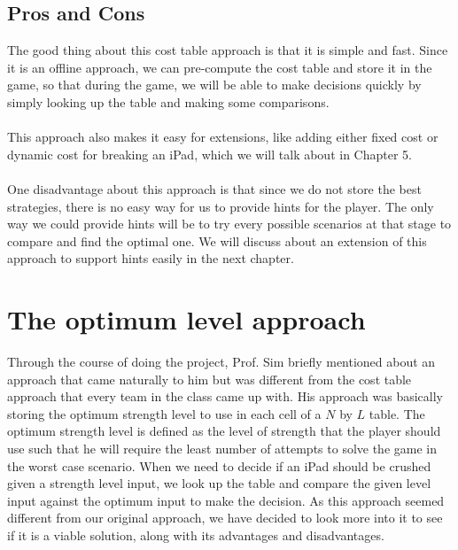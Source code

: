 \documentclass[12pt,a4paper,oneside]{report}
\begin{document}
\section{Pros and Cons}
The good thing about this cost table approach is that it is simple and fast. Since it is an offline approach, we can pre-compute the cost table and store it in the game, so that during the game, we will be able to make decisions quickly by simply looking up the table and making some comparisons. \\\\
This approach also makes it easy for extensions, like adding either fixed cost or dynamic cost for breaking an iPad, which we will talk about in Chapter 5. \\\\
One disadvantage about this approach is that since we do not store the best strategies, there is no easy way for us to provide hints for the player. The only way we could provide hints will be to try every possible scenarios at that stage to compare and find the optimal one. We will discuss about an extension of this approach to support hints easily in the next chapter.


\chapter{The optimum level approach}
Through the course of doing the project, Prof. Sim briefly mentioned about an approach that came naturally to him but was different from the cost table approach that every team in the class came up with. His approach was basically storing the optimum strength level to use in each cell of a $N$ by $L$ table. The optimum strength level is defined as the level of strength that the player should use such that he will require the least number of attempts to solve the game in the worst case scenario. When we need to decide if an iPad should be crushed given a strength level input, we look up the table and compare the given level input against the optimum input to make the decision. As this approach seemed different from our original approach, we have decided to look more into it to see if it is a viable solution, along with its advantages and disadvantages.
\end{document}
